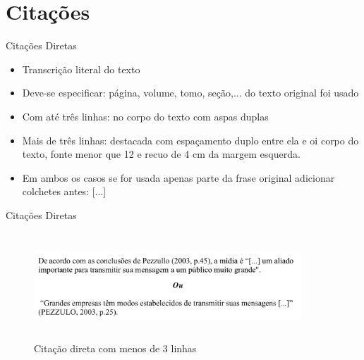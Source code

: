 \section{Citações}

\begin{frame}	
	\begin{block}{Citações Diretas}	
		\begin{itemize}
			\item Transcrição literal do texto
			\item Deve-se especificar: página, volume, tomo, seção,...  do texto original foi usado
			\item Com até três linhas: no corpo do texto com aspas duplas
			\item Mais de três linhas: destacada com espaçamento duplo entre ela e oi corpo do texto, fonte menor que 12 e recuo de 4 cm da margem esquerda.
			\item Em ambos os casos se for usada apenas parte da frase original adicionar colchetes antes: [...]
		\end{itemize}
	\end{block}
\end{frame}

\begin{frame}	
	\begin{block}{Citações Diretas}	
		 \begin{figure}[!htb]
			\centering	  				
			\includegraphics[height=4cm, width = 10cm]{./pic/diretamenos3linhas.png}
			\caption{Citação direta com menos de 3 linhas \cite{GUIA_SENAC}}
			\label{fig_citacaodiretamenos3linhas}
		\end{figure}
	\end{block}
\end{frame}

